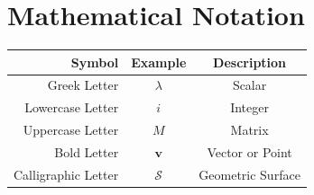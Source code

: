 \section*{Mathematical Notation} \label{sec:mathNotation}

\begin{tabular}[l]{r|c|c}
  \textbf{Symbol} & \textbf{Example} & \textbf{Description} \\
  \hline
  Greek Letter & $\lambda$ & Scalar \\
  Lowercase Letter & $i$ & Integer \\
  Uppercase Letter & $M$ & Matrix \\
  Bold Letter & $\bm v$ & Vector or Point \\
  Calligraphic Letter & $\mathcal S$ & Geometric Surface \\

\end{tabular}
